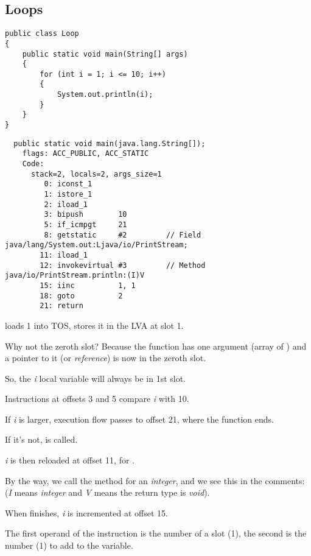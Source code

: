 \subsection{Loops}

\begin{lstlisting}[style=customjava]
public class Loop
{
	public static void main(String[] args)
	{ 
		for (int i = 1; i <= 10; i++)
		{
			System.out.println(i); 
		}               
	}
}
\end{lstlisting}

\begin{lstlisting}
  public static void main(java.lang.String[]);
    flags: ACC_PUBLIC, ACC_STATIC
    Code:
      stack=2, locals=2, args_size=1
         0: iconst_1      
         1: istore_1      
         2: iload_1       
         3: bipush        10
         5: if_icmpgt     21
         8: getstatic     #2         // Field java/lang/System.out:Ljava/io/PrintStream;
        11: iload_1       
        12: invokevirtual #3         // Method java/io/PrintStream.println:(I)V
        15: iinc          1, 1
        18: goto          2
        21: return        
\end{lstlisting}

 loads 1 into \ac{TOS},  stores it in the \ac{LVA} at slot 1.

Why not the zeroth slot?
Because the \main function has one argument (array of ) 
and a pointer to it (or \emph{reference}) is now in the zeroth slot.


So, the \emph{i} local variable will always be in 1st slot.


Instructions at offsets 3 and 5 compare \emph{i} with 10.

If \emph{i} is larger, execution flow passes to offset 21, where the function ends.

If it's not,  is called.

\emph{i} is then reloaded at offset 11, for .

By the way, we call the  method for an \emph{integer}, 
and we see this in the comments: 
(\emph{I} means \emph{integer} and \emph{V} means the return type is \emph{void}).


When  finishes, \emph{i} is incremented at offset 15.

The first operand of the instruction is the  number of a slot (1), 
the second is the number (1) to add to the variable.


